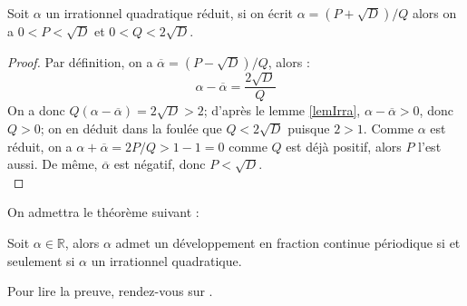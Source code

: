 \documentclass[a4paper]{article} %
\numberwithin{equation}{section}
\begin{document}
\begin{prop}
\label{borneQ}
Soit $\alpha$ un irrationnel quadratique réduit, si on écrit $\alpha = (P + \sqrt{D})/Q$ alors on a $0 < P < \sqrt{D}$ et $0 < Q < 2\sqrt{D}$.
\end{prop}
\begin{proof}
Par définition, on a $\overline{\alpha} = (P - \sqrt{D})/Q$, alors :
\[\alpha - \overline{\alpha} = \dfrac{2\sqrt{D}}{Q}\]
On a donc $Q(\alpha - \overline{\alpha}) = 2\sqrt{D} > 2$; d'après le lemme \ref{lemIrra}, $\alpha - \overline{\alpha} > 0$, donc $Q > 0$; on en déduit dans la foulée que $Q < 2\sqrt{D}$ puisque $2 > 1$. Comme $\alpha$ est réduit, on a $\alpha + \overline{\alpha} = 2P/Q > 1 - 1 = 0$ comme $Q$ est déjà positif, alors $P$ l'est aussi. De même, $\overline{\alpha}$ est négatif, donc $P < \sqrt{D}$.\\
\end{proof}
On admettra le théorème suivant :
\begin{thm}[Galois]
\label{Galois}
Soit $\alpha\in\mathbb{R}$, alors $\alpha$ admet un développement en fraction continue périodique si et seulement si $\alpha$ un irrationnel quadratique.
\end{thm}
Pour lire la preuve, rendez-vous sur \cite[p. 13]{CF}.
\end{document}
